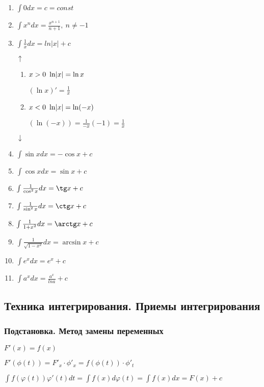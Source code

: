 \documentclass{article}
\begin{document}
    \begin{enumerate}
        \item \(\int 0dx = c = const\)
        \item \(\int x^{n}dx = \frac{x^{n+1}}{n+1},\ n \neq -1\)
        \item \(\int \frac{1}{x} dx = ln|x| + c \)
        
        \(\uparrow\)
        \begin{enumerate}
            \item \(x > 0\ \ln \abs{x} = \ln x\)
            
            \((\ln x)' = \frac{1}{x}\)
            \item \( x < 0\ \ln \abs{x} = \ln (-x)\)
            
            \((\ln (-x)) = \frac{1}{-x}(-1) = \frac{1}{x}\)
        \end{enumerate}
        \(\downarrow\)
        \item \(\int \sin x dx = -\cos x + c\)
        \item \(\int \cos x dx = \sin x + c\)
        \item \(\int \frac{1}{\cos^{2}x}dx = \tg x + c \)
        \item \(\int \frac{1}{\sin^{2}x}dx = \ctg x + c \)
        \item \(\int \frac{1}{1 + x^2}dx = \arctg x + c \)
        \item \(\int \frac{1}{\sqrt{1-x^2}}dx = \arcsin x + c\)
        \item \(\int e^x dx = e^x + c\)
        \item \(\int a^x dx = \frac{a^x}{ln a} + c\)
    \end{enumerate}

    
    \subsection{Техника интегрирования. Приемы интегрирования}

    \subsubsection{Подстановка. Метод замены переменных}

    \(F'(x) = f(x)\)
    
    \(F'(\phi(t)) = F'_{x} \cdot \phi'_{x} = f(\phi(t)) \cdot \phi'_t \)
    
    \(\int f(\varphi(t))\varphi'(t)dt = \int f(x) d\varphi(t) = \int f(x)dx = F(x) + c\)
\end{document}
